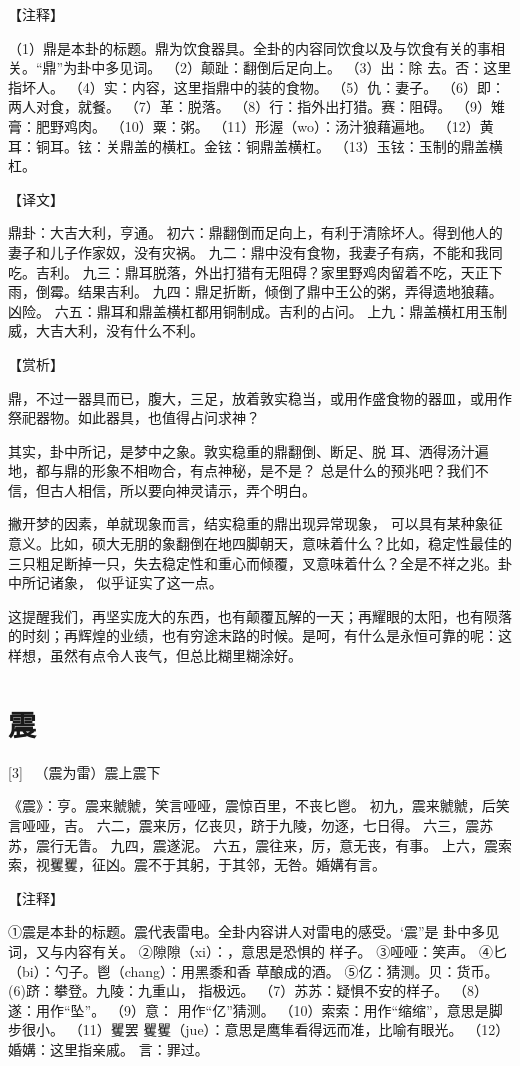 \documentclass[12pt,UTF8]{ctexbook}
\begin{document}
【注释】

（1）鼎是本卦的标题。鼎为饮食器具。全卦的内容同饮食以及与饮食有关的事相关。“鼎”为卦中多见词。
（2）颠趾：翻倒后足向上。
（3）出：除 去。否：这里指坏人。
（4）实：内容，这里指鼎中的装的食物。
（5）仇：妻子。
（6）即：两人对食，就餐。
（7）革：脱落。
（8）行：指外出打猎。赛：阻碍。
（9）雉膏：肥野鸡肉。
（10）粟：粥。
（11）形渥（wo）：汤汁狼藉遍地。
（12）黄耳：铜耳。铉：关鼎盖的横杠。金铉：铜鼎盖横杠。
（13）玉铉：玉制的鼎盖横杠。

【译文】

鼎卦：大吉大利，亨通。
初六：鼎翻倒而足向上，有利于清除坏人。得到他人的妻子和儿子作家奴，没有灾祸。
九二：鼎中没有食物，我妻子有病，不能和我同吃。吉利。
九三：鼎耳脱落，外出打猎有无阻碍？家里野鸡肉留着不吃，天正下雨，倒霉。结果吉利。
九四：鼎足折断，倾倒了鼎中王公的粥，弄得遗地狼藉。凶险。
六五：鼎耳和鼎盖横杠都用铜制成。吉利的占问。
上九：鼎盖横杠用玉制威，大吉大利，没有什么不利。

【赏析】

鼎，不过一器具而已，腹大，三足，放着敦实稳当，或用作盛食物的器皿，或用作祭祀器物。如此器具，也值得占问求神？

其实，卦中所记，是梦中之象。敦实稳重的鼎翻倒、断足、脱 耳、洒得汤汁遍地，都与鼎的形象不相吻合，有点神秘，是不是？ 总是什么的预兆吧？我们不信，但古人相信，所以要向神灵请示，弄个明白。

撇开梦的因素，单就现象而言，结实稳重的鼎出现异常现象， 可以具有某种象征意义。比如，硕大无朋的象翻倒在地四脚朝天，意味着什么？比如，稳定性最佳的三只粗足断掉一只，失去稳定性和重心而倾覆，叉意味着什么？全是不祥之兆。卦中所记诸象， 似乎证实了这一点。

这提醒我们，再坚实庞大的东西，也有颠覆瓦解的一天；再耀眼的太阳，也有陨落的时刻；再辉煌的业绩，也有穷途末路的时候。是呵，有什么是永恒可靠的呢：这样想，虽然有点令人丧气，但总比糊里糊涂好。

\chapter{震}

[3] \ （震为雷）震上震下

《震》：亨。震来虩虩，笑言哑哑，震惊百里，不丧匕鬯。
初九，震来虩虩，后笑言哑哑，吉。
六二，震来厉，亿丧贝，跻于九陵，勿逐，七日得。
六三，震苏苏，震行无眚。
九四，震遂泥。
六五，震往来，厉，意无丧，有事。
上六，震索索，视矍矍，征凶。震不于其躬，于其邻，无咎。婚媾有言。

【注释】

①震是本卦的标题。震代表雷电。全卦内容讲人对雷电的感受。‘震”是 卦中多见词，又与内容有关。
②隙隙（xi）：，意思是恐惧的 样子。
③哑哑：笑声。
④匕（bi）：勺子。鬯（chang）：用黑黍和香 草酿成的酒。
⑤亿：猜测。贝：货币。
(6)跻：攀登。九陵：九重山， 指极远。
（7）苏苏：疑惧不安的样子。
（8）遂：用作“坠”。
（9）意： 用作“亿”猜测。
（10）索索：用作“缩缩”，意思是脚步很小。
（11）矍罢 矍矍（jue）：意思是鹰隼看得远而准，比喻有眼光。
（12）婚媾：这里指亲戚。 言：罪过。
\end{document}
